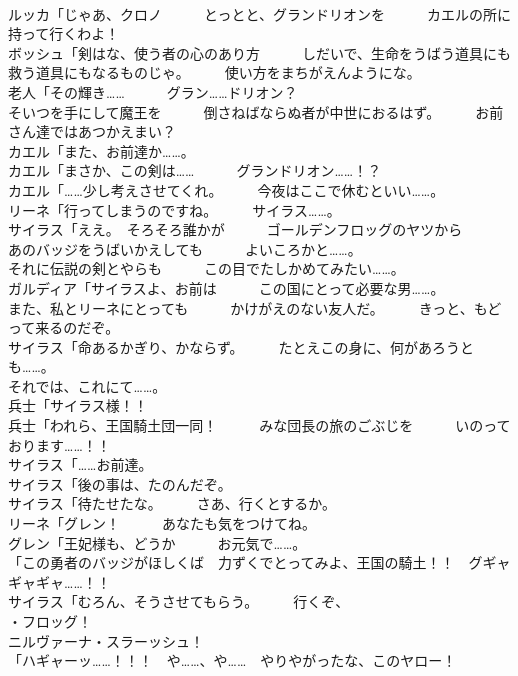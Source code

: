 \documentclass[8pt]{extreport}
\begin{document}
\begin{CJK}{UTF8}{min}
\\	ルッカ「じゃあ、クロノ　　　とっとと、グランドリオンを　　　カエルの所に持って行くわよ！	
\\	ボッシュ「剣はな、使う者の心のあり方　　　しだいで、生命をうばう道具にも　　　救う道具にもなるものじゃ。　　　使い方をまちがえんようにな。	
\\	老人「その輝き……　　　グラン……ドリオン？	
\\	そいつを手にして魔王を　　　倒さねばならぬ者が中世におるはず。　　　お前さん達ではあつかえまい？	
\\	カエル「また、お前達か……。	
\\	カエル「まさか、この剣は……　　　グランドリオン……！？	
\\	カエル「……少し考えさせてくれ。　　　今夜はここで休むといい……。	
\\	リーネ「行ってしまうのですね。　　　サイラス……。	
\\	サイラス「ええ。　そろそろ誰かが　　　ゴールデンフロッグのヤツから　　　あのバッジをうばいかえしても　　　よいころかと……。	
\\	それに伝説の剣とやらも　　　この目でたしかめてみたい……。	
\\	ガルディア「サイラスよ、お前は　　　この国にとって必要な男……。	
\\	また、私とリーネにとっても　　　かけがえのない友人だ。　　　きっと、もどって来るのだぞ。	
\\	サイラス「命あるかぎり、かならず。　　　たとえこの身に、何があろうとも……。	
\\	それでは、これにて……。	
\\	兵士「サイラス様！！	
\\	兵士「われら、王国騎土団一同！　　　みな団長の旅のごぶじを　　　いのっております……！！	
\\	サイラス「……お前達。	
\\	サイラス「後の事は、たのんだぞ。	
\\	サイラス「待たせたな。　　　さあ、行くとするか。	
\\	リーネ「グレン！　　　あなたも気をつけてね。	
\\	グレン「王妃様も、どうか　　　お元気で……。	
\\	「この勇者のバッジがほしくば　力ずくでとってみよ、王国の騎土！！　グギャギャギャ……！！	
\\	サイラス「むろん、そうさせてもらう。　　　行くぞ、
\\	・フロッグ！	
\\	ニルヴァーナ・スラーッシュ！	
\\	「ハギャーッ……！！！　や……、や……　やりやがったな、このヤロー！	

\end{CJK}
\end{document}
